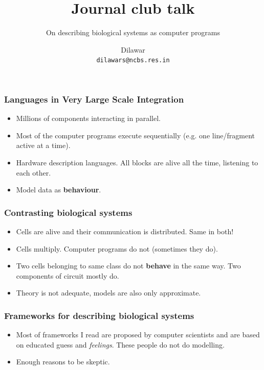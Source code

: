 \documentclass{beamer}
\author{Dilawar \\
  \texttt{dilawars@ncbs.res.in}
}
\title{Journal club talk}
\subtitle{On describing biological systems as computer programs}
\begin{document}
\maketitle 

\begin{frame}
  \frametitle{Languages in \textbf{Very Large Scale Integration}}
  \begin{itemize}
    \item Millions of components interacting in parallel. 
    \item Most of the computer
      programs execute sequentially (e.g. one line/fragment active at a time).
    \item Hardware description languages. All blocks are alive all the time,
      listening to each other.
    \item Model data as \textbf{ behaviour}.
  \end{itemize}
\end{frame}

\begin{frame}
  \frametitle{Contrasting biological systems}
  \begin{itemize}
    \item Cells are alive and their communication is distributed. Same in both!
    \item Cells multiply. Computer programs do not (sometimes they do).
    \item Two cells belonging to same class do not \textbf{behave} in the same
      way. Two components of circuit mostly do.
    \item Theory is not adequate, models are also only approximate.
  \end{itemize}
\end{frame}

\begin{frame}
  \frametitle{Frameworks for describing biological systems}
  \begin{itemize}
    \item Most of frameworks I read are proposed by computer scientists and are
      based on educated guess and \emph{feelings}. These people do not do
      modelling.
    \item Enough reasons to be skeptic.
     \end{itemize}
   \end{frame}
\end{document}

